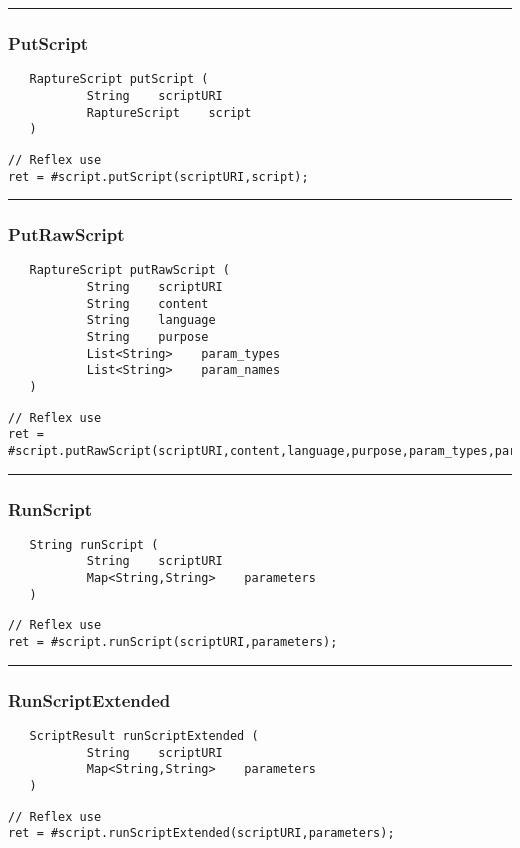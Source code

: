 \rule{15cm}{2pt}
\subsubsection{PutScript}
\label{Api:PutScript}
\begin{verbatim}
   RaptureScript putScript (
           String    scriptURI
           RaptureScript    script
   )
\end{verbatim}
\begin{lstlisting}[language=reflex]
// Reflex use
ret = #script.putScript(scriptURI,script);
\end{lstlisting}



\rule{15cm}{2pt}
\subsubsection{PutRawScript}
\label{Api:PutRawScript}
\begin{verbatim}
   RaptureScript putRawScript (
           String    scriptURI
           String    content
           String    language
           String    purpose
           List<String>    param_types
           List<String>    param_names
   )
\end{verbatim}
\begin{lstlisting}[language=reflex]
// Reflex use
ret = #script.putRawScript(scriptURI,content,language,purpose,param_types,param_names);
\end{lstlisting}



\rule{15cm}{2pt}
\subsubsection{RunScript}
\label{Api:RunScript}
\begin{verbatim}
   String runScript (
           String    scriptURI
           Map<String,String>    parameters
   )
\end{verbatim}
\begin{lstlisting}[language=reflex]
// Reflex use
ret = #script.runScript(scriptURI,parameters);
\end{lstlisting}



\rule{15cm}{2pt}
\subsubsection{RunScriptExtended}
\label{Api:RunScriptExtended}
\begin{verbatim}
   ScriptResult runScriptExtended (
           String    scriptURI
           Map<String,String>    parameters
   )
\end{verbatim}
\begin{lstlisting}[language=reflex]
// Reflex use
ret = #script.runScriptExtended(scriptURI,parameters);
\end{lstlisting}



